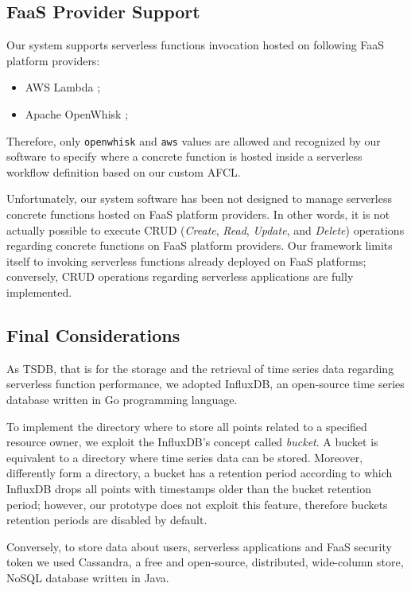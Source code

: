 \documentclass[12pt,a4paper]{report}
\begin{document}
\subsection{FaaS Provider Support}

Our system supports serverless functions invocation hosted on following FaaS platform providers:

\begin{itemize}
	\item AWS Lambda \cite{AWSLambda};
	\item Apache OpenWhisk \cite{OpenWhisk};
\end{itemize}

Therefore, only \texttt{openwhisk} and \texttt{aws} values are allowed and recognized by our software to specify where a concrete function is hosted inside a serverless workflow definition based on our custom AFCL.

Unfortunately, our system software has been not designed to manage serverless concrete functions hosted on FaaS platform providers. In other words, it is not actually possible to execute CRUD (\textit{Create}, \textit{Read}, \textit{Update}, and \textit{Delete}) operations regarding concrete functions on FaaS platform providers. Our framework limits itself to invoking serverless functions already deployed on FaaS platforms; conversely, CRUD operations regarding serverless applications are fully implemented.

\subsection{Final Considerations}

As TSDB, that is for the storage and the retrieval of time series data regarding serverless function performance, we adopted InfluxDB\cite{influx}, an open-source time series database written in Go programming language.

To implement the directory where to store all points related to a specified resource owner, we exploit the InfluxDB's concept called \textit{bucket}. A bucket is equivalent to a directory where time series data can be stored. Moreover, differently form a directory, a bucket has a retention period according to which InfluxDB drops all points with timestamps older than the bucket retention period; however, our prototype does not exploit this feature, therefore buckets retention periods are disabled by default.

Conversely, to store data about users, serverless applications and FaaS security token we used Cassandra\cite{cassandra}, a free and open-source, distributed, wide-column store, NoSQL database written in Java. 
\end{document}
